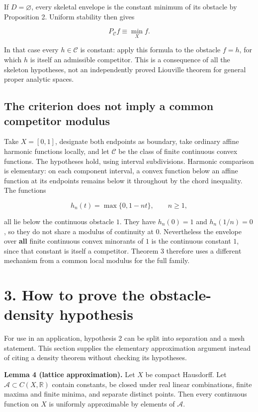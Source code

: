 \documentclass[
  11pt,
]{article}
\begin{document}
If \(D=\varnothing\), every skeletal envelope is the constant minimum of
its obstacle by Proposition 2. Uniform stability then gives

\[P_{\mathcal C}f\equiv\min_Xf.\]

In that case every \(h\in\mathcal C\) is constant: apply this formula to
the obstacle \(f=h\), for which \(h\) is itself an admissible
competitor. This is a consequence of all the skeleton hypotheses, not an
independently proved Liouville theorem for general proper analytic
spaces.

\subsection{The criterion does not imply a common competitor
modulus}\label{the-criterion-does-not-imply-a-common-competitor-modulus}

Take \(X=[0,1]\), designate both endpoints as boundary, take ordinary
affine harmonic functions locally, and let \(\mathcal C\) be the class
of finite continuous convex functions. The hypotheses hold, using
interval subdivisions. Harmonic comparison is elementary: on each
component interval, a convex function below an affine function at its
endpoints remains below it throughout by the chord inequality. The
functions

\[h_n(t)=\max\{0,1-nt\},\qquad n\geq1,\]

all lie below the continuous obstacle \(1\). They have \(h_n(0)=1\) and
\(h_n(1/n)=0\), so they do not share a modulus of continuity at \(0\).
Nevertheless the envelope over \textbf{all} finite continuous convex
minorants of \(1\) is the continuous constant \(1\), since that constant
is itself a competitor. Theorem 3 therefore uses a different mechanism
from a common local modulus for the full family.

\section{3. How to prove the obstacle-density
hypothesis}\label{how-to-prove-the-obstacle-density-hypothesis}

For use in an application, hypothesis 2 can be split into separation and
a mesh statement. This section supplies the elementary approximation
argument instead of citing a density theorem without checking its
hypotheses.

\textbf{Lemma 4 (lattice approximation).} Let \(X\) be compact
Hausdorff. Let \(\mathcal A\subset C(X,\mathbb R)\) contain constants,
be closed under real linear combinations, finite maxima and finite
minima, and separate distinct points. Then every continuous function on
\(X\) is uniformly approximable by elements of \(\mathcal A\).
\end{document}
